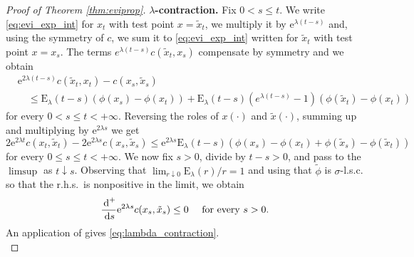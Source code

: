 \documentclass[reqno]{amsart}
\theoremstyle{plain}
\theoremstyle{remark}
\theoremstyle{plain}
\numberwithin{equation}{section}
\theoremstyle{remark}
\newcommand{\rme}{{\mathrm e}}
\newcommand{\tb}{\textbf}
\newcommand{\de}{{\,\rm d}}
\begin{document}
\begin{proof}[Proof of Theorem \ref{thm:eviprop}] 
    \tb{\bf  $\lambda$-contraction.}  Fix  $0 < s \le t$. We write \eqref{eq:evi_exp_int} for  $x_t$ with test point $ x=\tilde{x}_t$, we multiply it by $\rme^{\lambda(t-s)}$ and, using the symmetry of $c$, we sum it to \eqref{eq:evi_exp_int} written for $\tilde{x}_t$  with test point $ x= x_s$. The terms $e^{\lambda(t-s)}c(\tilde{x}_t, x_s)$ compensate by symmetry and we obtain
    \begin{align*}
    &\rme^{2\lambda(t-s)} c(\tilde{x}_t, x_t) - c(x_s, \tilde{x}_s) \\
    &\quad \le \mathrm{E}_\lambda(t-s) \left (\phi(x_s)-\phi(x_t) \right ) + \mathrm{E}_\lambda(t-s) \left ( e^{\lambda(t-s)}-1 \right ) \left ( \phi(\tilde{x}_t) - \phi(x_t) \right )
    \end{align*}
    for every $0  <  s \le t < + \infty$. Reversing the roles of  $x(\cdot)$ and $\tilde{x}(\cdot)$,  summing up and multiplying by $\rme^{2\lambda s}$ we get
   \[ 2 \rme^{2\lambda t} c(x_t, \tilde{x}_t) - 2\rme^{2\lambda s} c(x_s, \tilde{x}_s) \le \rme^{2\lambda s} \mathrm{E}_\lambda(t-s) \left ( \phi(x_s)-\phi(x_t) + \phi(\tilde{x}_s)-\phi(\tilde{x}_t) \right )\]
    for every $0 \le s \le t < + \infty$. We  now  fix $s>0$,  divide by $t-s>0$,  and  pass to the $\limsup$ as $t \downarrow s$. Observing that $\lim_{r \downarrow 0}\mathrm{E}_\lambda(r)/r=1$ and using that $\tilde \phi$ is $\sigma$-l.s.c. so that the r.h.s.\ is nonpositive in the limit, we obtain
    \[ \frac{\de^+}{\de s} \rme^{2\lambda s} c(x_s, \tilde{x}_s) \le 0 \quad \text{ for every } s >0.\]
    An application of \cite[Lemma A.1]{MuratoriSavare} gives  \eqref{eq:lambda_contraction}.\\
    

\end{proof}
\end{document}
